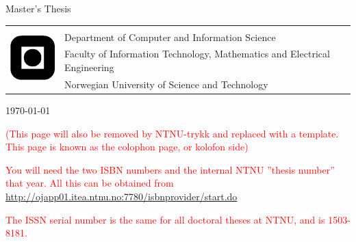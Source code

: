 \begin{titlepage}
\begin{center}

\vspace*{2cm}

\huge{\textcolor{blue}{\thesisTitle}}


\vspace{.5cm}
\large{\textcolor{blue}{\thesisAuthor}}



\vspace{1cm}


\vspace{1cm}
\huge{Master's Thesis}


\vspace{6cm}


\end{center}
\normalsize

\begin{table}[!h]
\begin{tabular}{ll}
\multirow{4}{*}{\includegraphics[width=20mm]{../img/logo}} & \\
& Department of Computer and Information Science \\
& Faculty of Information Technology, Mathematics and Electrical Engineering \\
& Norwegian University of Science and Technology \\

\end{tabular}
\end{table}



\vspace{.5cm}


\begin{center}
\today
\end{center}

\end{titlepage}

\clearpage

\thispagestyle{empty}

\vspace*{15cm}

\textcolor{red}{(This page will also be removed by NTNU-trykk and replaced with a template. This page is known as the colophon page, or kolofon side)}

\textcolor{red}{You will need the two ISBN numbers and the internal NTNU ''thesis number'' that year. All this can be 
obtained from  \url{http://ojapp01.itea.ntnu.no:7780/isbnprovider/start.do}} 

\textcolor{red}{The ISSN serial number is the same for all doctoral theses at NTNU, and is 1503-8181.}
\clearpage



